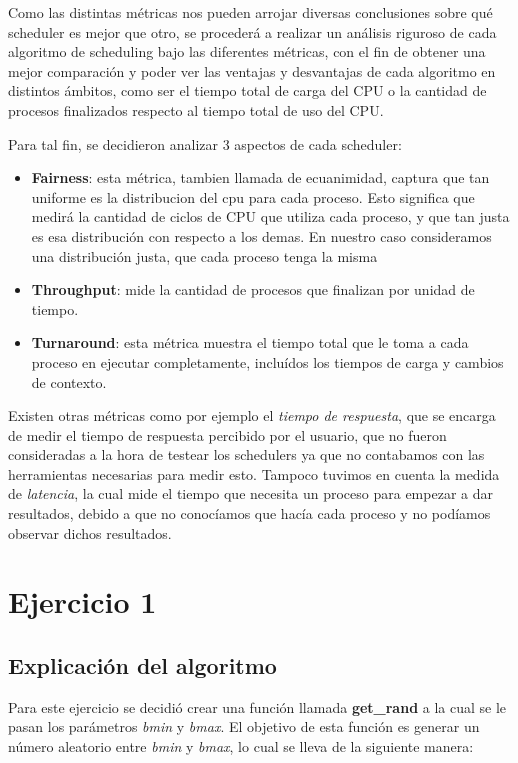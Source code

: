 \documentclass[a4paper]{article}
\begin{document}
Como las distintas métricas nos pueden arrojar diversas conclusiones sobre
qué scheduler es mejor que otro, se procederá a realizar un análisis
riguroso de cada algoritmo de scheduling bajo las diferentes métricas, con
el fin de obtener una mejor comparación y poder ver las ventajas y
desvantajas de cada algoritmo en distintos ámbitos, como ser el tiempo total
de carga del CPU o la cantidad de procesos finalizados respecto al tiempo
total de uso del CPU.

Para tal fin, se decidieron analizar 3 aspectos de cada scheduler:

\begin{itemize}
  \item \textbf{Fairness}: esta métrica, tambien llamada de ecuanimidad,
  captura que tan uniforme es la distribucion del cpu para cada proceso.
  Esto significa que medirá la cantidad de ciclos de CPU que utiliza cada
  proceso, y que tan justa es esa distribución con respecto a los demas. En
  nuestro caso consideramos una distribución justa, que cada proceso tenga
  la misma
  \item \textbf{Throughput}: mide la cantidad de procesos que finalizan por
  unidad de tiempo.
  \item \textbf{Turnaround}: esta métrica muestra el tiempo total que le
  toma a cada proceso en ejecutar completamente, incluídos los tiempos de
  carga y cambios de contexto.
\end{itemize}

Existen otras métricas como por ejemplo el \textit{tiempo de respuesta}, que
se encarga de medir el tiempo de respuesta percibido por el usuario,
que no fueron consideradas a la hora de testear los schedulers ya que
no contabamos con las herramientas necesarias para medir esto. Tampoco
tuvimos en cuenta la medida de \textit{latencia}, la cual mide el tiempo que
necesita un proceso para empezar a dar resultados, debido a que no
conocíamos que hacía cada proceso y no podíamos observar dichos resultados.
\newpage


\section{Ejercicio 1}

\subsection{Explicación del algoritmo}
Para este ejercicio se decidió crear una función llamada \textbf{get\_rand}
a la cual se le pasan los parámetros \textit{bmin} y \textit{bmax}. El
objetivo de esta función es generar un número aleatorio entre \textit{bmin}
y \textit{bmax}, lo cual se lleva de la siguiente manera:
\end{document}
